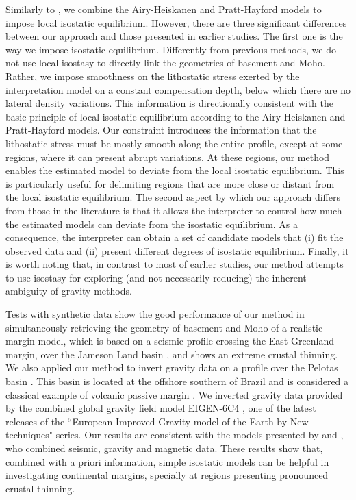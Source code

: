\documentclass[manuscript,revised]{geophysics}
\begin{document}
Similarly to \citet{ferderer-etal2017}, we combine the Airy-Heiskanen and Pratt-Hayford
models to impose local isostatic equilibrium. However, there are three significant differences
between our approach and those presented in earlier studies.
The first one is the way we impose isostatic equilibrium. Differently from previous 
methods, we do not use local isostasy to directly link the geometries of basement and Moho.
Rather, we impose smoothness on the lithostatic stress exerted by the interpretation 
model on a constant compensation depth, below which there are no lateral density variations.
This information is directionally consistent with the basic principle of 
local isostatic equilibrium according to the Airy-Heiskanen and Pratt-Hayford models.
Our constraint introduces the information that the lithostatic stress must be mostly 
smooth along the entire profile, except at some regions, where it can present abrupt
variations. At these regions, our method enables the estimated model to deviate from the 
local isostatic equilibrium. 
This is particularly useful for delimiting regions that are more close or distant from the 
local isostatic equilibrium.
The second aspect by which our approach differs from those in the literature
is that it allows the interpreter to control how much the 
estimated models can deviate from the isostatic equilibrium.
As a consequence, the interpreter can obtain a set of candidate models 
that (i) fit the observed data and (ii) present different degrees of isostatic 
equilibrium.
Finally, it is worth noting that, in contrast to most of earlier studies, our method 
attempts to use isostasy for exploring (and not necessarily reducing) the inherent 
ambiguity of gravity methods.

Tests with synthetic data show the good performance of our method in simultaneously
retrieving the geometry of basement and Moho of a realistic margin model,
which is based on a seismic profile crossing the East Greenland margin,
over the Jameson Land basin \citep{peron-etal2013}, and shows an extreme crustal thinning.
We also applied our method to invert gravity data on a profile over the Pelotas basin 
\citep{stica-etal2014}. This basin is located at the offshore southern of Brazil and is 
considered a classical example of volcanic passive margin \citep{geoffroy2005}. 
We inverted gravity data provided by the combined global gravity field model EIGEN-6C4
\citep{forste2014}, one of the latest releases of the ``European Improved Gravity model of 
the Earth by New techniques" series.
Our results are consistent with the models presented by \citet{stica-etal2014} and
\citet{zalan2015}, who combined seismic, gravity and magnetic data.
These results show that, combined with a priori information, simple isostatic models 
can be helpful in investigating continental margins, specially at regions presenting pronounced 
crustal thinning.
\end{document}
